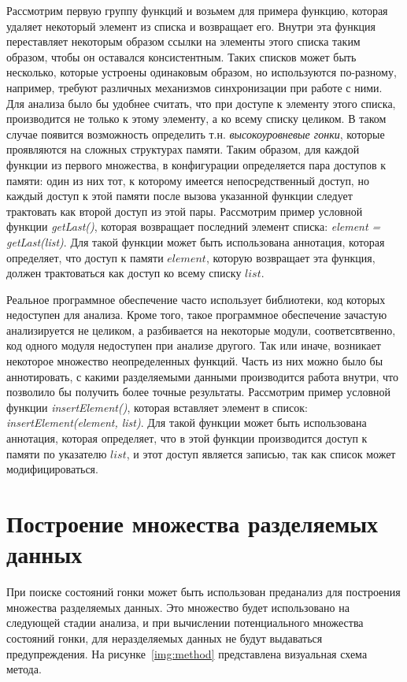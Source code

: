 Рассмотрим первую группу функций и возьмем для примера функцию, которая удаляет некоторый элемент из списка и возвращает его.
Внутри эта функция переставляет некоторым образом ссылки на элементы этого списка таким образом, чтобы он оставался консистентным.
Таких списков может быть несколько, которые устроены одинаковым образом, но используются по-разному, например, требуют различных механизмов синхронизации при работе с ними. 
Для анализа было бы удобнее считать, что при доступе к элементу этого списка, производится не только к этому элементу, а ко всему списку целиком. 
В таком случае появится возможность определить т.н. \textit{высокоуровневые гонки}, которые проявляются на сложных структурах памяти.
Таким образом, для каждой функции из первого множества, в конфигурации определяется пара доступов к памяти: один из них тот, к которому имеется непосредственный доступ, но каждый доступ к этой памяти после вызова указанной функции следует трактовать как второй доступ из этой пары.
Рассмотрим пример условной функции \textit{getLast()}, которая возвращает последний элемент списка: \textit{element = getLast(list)}.
Для такой функции может быть использована аннотация, которая определяет, что доступ к памяти $element$, которую возвращает эта функция, должен трактоваться как доступ ко всему списку $list$. 

Реальное программное обеспечение часто использует библиотеки, код которых недоступен для анализа.
Кроме того, такое программное обеспечение зачастую анализируется не целиком, а разбивается на некоторые модули, соответсвтвенно, код одного модуля недоступен при анализе другого.
Так или иначе, возникает некоторое множество неопределенных функций.
Часть из них можно было бы аннотировать, с какими разделяемыми данными производится работа внутри, что позволило бы получить более точные результаты.
Рассмотрим пример условной функции \textit{insertElement()}, которая вставляет элемент в список: \textit{insertElement(element, list)}.
Для такой функции может быть использована аннотация, которая определяет, что в этой функции производится доступ к памяти по указателю $list$, и этот доступ является записью, так как список может модифицироваться.


\section{Построение множества разделяемых данных}
\label{sect_shared_analysis}
При поиске состояний гонки может быть использован преданализ для построения множества разделяемых данных.
Это множество будет использовано на следующей стадии анализа, и при вычислении потенциального множества состояний гонки, для неразделяемых данных не будут выдаваться предупреждения.
На рисунке~\ref{img:method} представлена визуальная схема метода.

